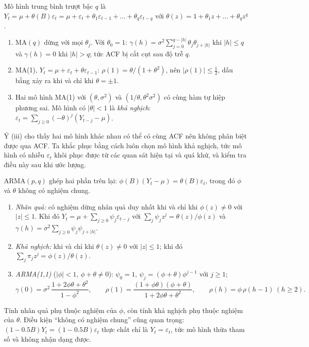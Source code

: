 Mô hình trung bình trượt bậc $q$ là $Y_t=\mu+\theta(B)\varepsilon_t=\mu+\varepsilon_t+\theta_1\varepsilon_{t-1}+\dots+\theta_q\varepsilon_{t-q}$ với $\theta(z)=1+\theta_1z+\dots+\theta_qz^q$.
\begin{kq}
\begin{enumerate}[label=(\roman*),leftmargin=*,itemsep=1pt]
\item MA$(q)$ dừng với mọi $\theta_j$. Với $\theta_0=1$: $\gamma(h)=\sigma^2\sum_{j=0}^{q-|h|}\theta_j\theta_{j+|h|}$ khi $|h|\le q$ và $\gamma(h)=0$ khi $|h|>q$; tức ACF bị cắt cụt sau độ trễ $q$.
\item MA(1), $Y_t=\mu+\varepsilon_t+\theta\varepsilon_{t-1}$: $\rho(1)=\theta/(1+\theta^2)$, nên $|\rho(1)|\le\tfrac12$, dấu bằng xảy ra khi và chỉ khi $\theta=\pm1$.
\item Hai mô hình MA(1) với $(\theta,\sigma^2)$ và $(1/\theta,\theta^2\sigma^2)$ có cùng hàm tự hiệp phương sai. Mô hình có $|\theta|<1$ là \emph{khả nghịch}: $\varepsilon_t=\sum_{j\ge0}(-\theta)^j(Y_{t-j}-\mu)$.
\end{enumerate}
\end{kq}
Ý (iii) cho thấy hai mô hình khác nhau có thể có cùng ACF nên không phân biệt được qua ACF. Ta khắc phục bằng cách luôn chọn mô hình khả nghịch, tức mô hình có nhiễu $\varepsilon_t$ khôi phục được từ các quan sát hiện tại và quá khứ, và kiểm tra điều này sau khi ước lượng.

ARMA$(p,q)$ ghép hai phần trên lại: $\phi(B)(Y_t-\mu)=\theta(B)\varepsilon_t$, trong đó $\phi$ và $\theta$ không có nghiệm chung.
\begin{kq}
\begin{enumerate}[label=(\roman*),leftmargin=*,itemsep=1pt]
\item \emph{Nhân quả:} có nghiệm dừng nhân quả duy nhất khi và chỉ khi $\phi(z)\ne0$ với $|z|\le1$. Khi đó $Y_t=\mu+\sum_{j\ge0}\psi_j\varepsilon_{t-j}$ với $\sum_j\psi_jz^j=\theta(z)/\phi(z)$ và $\gamma(h)=\sigma^2\sum_{j\ge0}\psi_j\psi_{j+|h|}$.
\item \emph{Khả nghịch:} khi và chỉ khi $\theta(z)\ne0$ với $|z|\le1$; khi đó $\sum_j\pi_jz^j=\phi(z)/\theta(z)$.
\item \emph{ARMA(1,1)} ($|\phi|<1$, $\phi+\theta\ne0$): $\psi_0=1$, $\psi_j=(\phi+\theta)\phi^{j-1}$ với $j\ge1$;
\[
\gamma(0)=\sigma^2\,\frac{1+2\phi\theta+\theta^2}{1-\phi^2},\qquad \rho(1)=\frac{(1+\phi\theta)(\phi+\theta)}{1+2\phi\theta+\theta^2},\qquad \rho(h)=\phi\,\rho(h-1)\ (h\ge2).
\]
\end{enumerate}
\end{kq}
Tính nhân quả phụ thuộc nghiệm của $\phi$, còn tính khả nghịch phụ thuộc nghiệm của $\theta$. Điều kiện ``không có nghiệm chung'' cũng quan trọng: $(1-0.5B)Y_t=(1-0.5B)\varepsilon_t$ thực chất chỉ là $Y_t=\varepsilon_t$, tức mô hình thừa tham số và không nhận dạng được.

